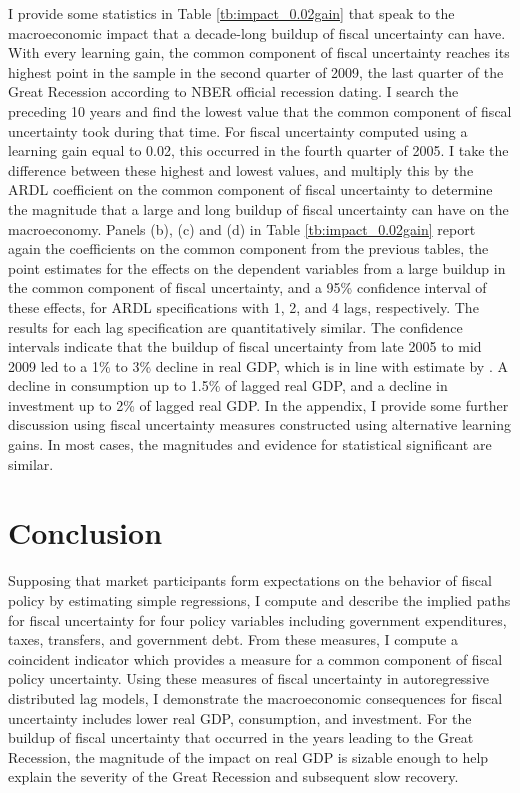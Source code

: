 \documentclass[11pt]{article}
\begin{document}
I provide some statistics in Table \ref{tb:impact_0.02gain} that speak to the macroeconomic impact that a decade-long buildup of fiscal uncertainty can have.  With every learning gain, the common component of fiscal uncertainty reaches its highest point in the sample in the second quarter of 2009, the last quarter of the Great Recession according to NBER official recession dating.  I search the preceding 10 years and find the lowest value that the common component of fiscal uncertainty took during that time.  For fiscal uncertainty computed using a learning gain equal to 0.02, this occurred in the fourth quarter of 2005.  I take the difference between these highest and lowest values, and multiply this by the ARDL coefficient on the common component of fiscal uncertainty to determine the magnitude that a large and long buildup of fiscal uncertainty can have on the macroeconomy.  Panels (b), (c) and (d) in Table \ref{tb:impact_0.02gain} report again the coefficients on the common component from the previous tables, the point estimates for the effects on the dependent variables from a large buildup in the common component of fiscal uncertainty, and a 95\% confidence interval of these effects, for ARDL specifications with 1, 2, and 4 lags, respectively.  The results for each lag specification are quantitatively similar.  The confidence intervals indicate that the buildup of fiscal uncertainty from late 2005 to mid 2009 led to a 1\% to 3\% decline in real GDP, which is in line with estimate by \cite{baker2013}.  A decline in consumption up to 1.5\% of lagged real GDP, and a decline in investment up to 2\% of lagged real GDP.  In the appendix, I provide some further discussion using fiscal uncertainty measures constructed using alternative learning gains.  In most cases, the magnitudes and evidence for statistical significant are similar.

\section{Conclusion}

Supposing that market participants form expectations on the behavior of fiscal policy by estimating simple regressions, I compute and describe the implied paths for fiscal uncertainty for four policy variables including government expenditures, taxes, transfers, and government debt.  From these measures, I compute a coincident indicator which provides a measure for a common component of fiscal policy uncertainty.  Using these measures of fiscal uncertainty in autoregressive distributed lag models, I demonstrate the macroeconomic consequences for fiscal uncertainty includes lower real GDP, consumption, and investment.  For the buildup of fiscal uncertainty that occurred in the years leading to the Great Recession, the magnitude of the impact on real GDP is sizable enough to help explain the severity of the Great Recession and subsequent slow recovery.
\end{document}
